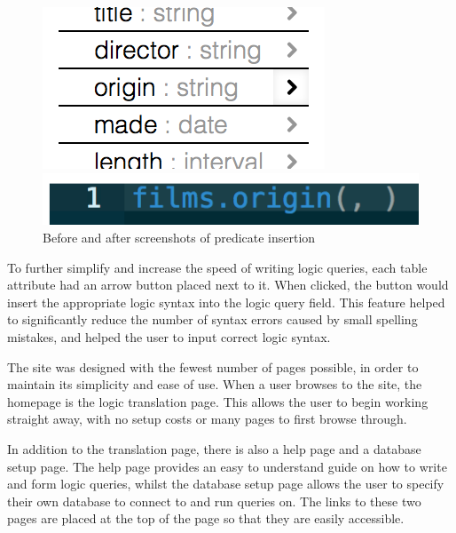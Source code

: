 \documentclass[a4paper, 11pt]{article}
\begin{document}
      \begin{figure}[h!]
        \centering
        \begin{minipage}{0.49\textwidth}
          \centering
          \includegraphics[]{images/site_schema_insert.png}
        \end{minipage}%
        \begin{minipage}{0.49\textwidth}
          \centering
          \includegraphics[width=\textwidth]{images/site_schema_inserted.png}
        \end{minipage}
        \caption{Before and after screenshots of predicate insertion}
      \end{figure}

      To further simplify and increase the speed of writing logic queries,
      each table attribute had an arrow button placed next to it. When clicked,
      the button would insert the appropriate logic syntax into the logic query
      field. This feature helped to significantly reduce the number of syntax
      errors caused by small spelling mistakes, and helped the user to input
      correct logic syntax.

      The site was designed with the fewest number of pages possible, in order
      to maintain its simplicity and ease of use. When a user browses to the
      site, the homepage is the logic translation page. This allows the user to
      begin working straight away, with no setup costs or many pages to first
      browse through.

      In addition to the translation page, there is also a help page and a
      database setup page. The help page provides an easy to understand guide
      on how to write and form logic queries, whilst the database setup page
      allows the user to specify their own database to connect to and run
      queries on. The links to these two pages are placed at the top of the page
      so that they are easily accessible.
 
\end{document}
